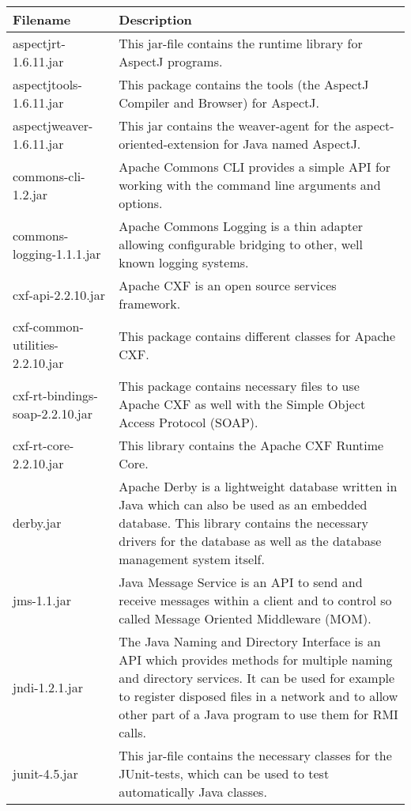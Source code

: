 \begin{center}
\begin{longtable}{|p{}|p{}|}
\hline 
Filename & Description\\
\hline
\hline 
aspectjrt-1.6.11.jar & This jar-file contains the runtime library for AspectJ programs.\\
\hline 
aspectjtools-1.6.11.jar & This package contains the tools (the AspectJ Compiler and Browser) for AspectJ.\\
\hline 
aspectjweaver-1.6.11.jar & This jar contains the weaver-agent for the aspect-oriented-extension for Java named AspectJ.\\
\hline 
commons-cli-1.2.jar & Apache Commons CLI provides a simple API for working with the command line arguments and options.\\
\hline 
commons-logging-1.1.1.jar & Apache Commons Logging is a thin adapter allowing configurable bridging to other, well known logging systems.\\
\hline 
cxf-api-2.2.10.jar & Apache CXF is an open source services framework.  \\
\hline 
cxf-common-utilities-2.2.10.jar & This package contains different classes for Apache CXF.\\
\hline 
cxf-rt-bindings-soap-2.2.10.jar & This package contains necessary files to use Apache CXF as well with the Simple Object Access Protocol (SOAP).\\
\hline 
cxf-rt-core-2.2.10.jar & This library contains the Apache CXF Runtime Core. \\
\hline 
derby.jar & Apache Derby is a lightweight database written in Java which can also be used as an embedded database. This library contains the necessary drivers for the database as well as the database management system itself.\\
\hline 
jms-1.1.jar & Java Message Service is an API to send and receive messages within a client and to control so called Message Oriented Middleware (MOM).\\
\hline 
jndi-1.2.1.jar & The Java Naming and Directory Interface is an API which provides methods for multiple naming and directory services. It can be used for example to register disposed files in a network and to allow other part of a Java program to use them for RMI calls.\\
\hline 
junit-4.5.jar & This jar-file contains the necessary classes for the JUnit-tests, which can be used to test automatically Java classes.\\

\end{longtable}
\end{center}
